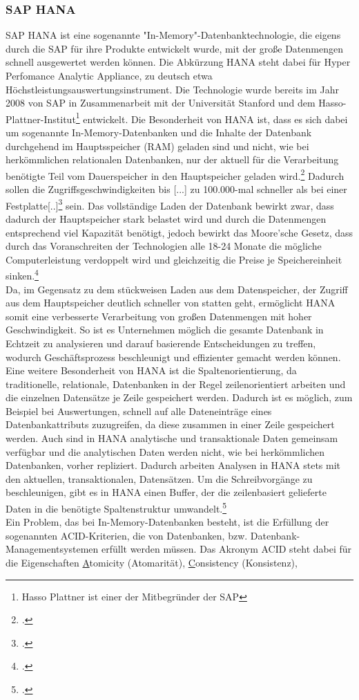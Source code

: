 \subsubsection{SAP HANA}
SAP HANA ist eine sogenannte "In-Memory"-Datenbanktechnologie, die eigens durch die SAP für ihre Produkte entwickelt wurde, mit der große Datenmengen schnell ausgewertet werden können. Die Abkürzung HANA steht dabei für \glqq{}Hyper Perfomance Analytic Appliance\grqq{}, zu deutsch etwa \glqq{}Höchstleistungsauswertungsinstrument\grqq{}. Die Technologie wurde bereits im Jahr 2008 von SAP in Zusammenarbeit mit der Universität Stanford und dem Hasso-Plattner-Institut\footnote{Hasso Plattner ist einer der Mitbegründer der SAP} entwickelt. Die Besonderheit von HANA ist, dass es sich dabei um sogenannte \glqq{}In-Memory-Datenbanken\grqq{} und die Inhalte der Datenbank durchgehend im Hauptsspeicher (RAM) geladen sind und nicht, wie bei herkömmlichen relationalen Datenbanken, nur der aktuell für die Verarbeitung benötigte Teil vom Dauerspeicher in den Hauptspeicher geladen wird.\footcite[Vgl.][]{was-hana} Dadurch sollen die Zugriffsgeschwindigkeiten bis \glqq{}[...] zu 100.000-mal schneller als bei einer Festplatte[..]\grqq{}\footcite[Vgl.][]{rz10-hana} sein. Das vollständige Laden der Datenbank bewirkt zwar, dass dadurch der Hauptspeicher stark belastet wird und durch die Datenmengen entsprechend viel Kapazität benötigt, jedoch bewirkt das Moore'sche Gesetz, dass durch das Voranschreiten der Technologien alle 18-24 Monate die mögliche Computerleistung verdoppelt wird und gleichzeitig die Preise je Speichereinheit sinken.\footcite[Vgl.][]{mooresches}\\ Da, im Gegensatz zu dem stückweisen Laden aus dem Datenspeicher, der Zugriff aus dem Hauptspeicher deutlich schneller von statten geht, ermöglicht HANA somit eine verbesserte Verarbeitung von großen Datenmengen mit hoher Geschwindigkeit. So ist es Unternehmen möglich die gesamte Datenbank in Echtzeit zu analysieren und darauf basierende Entscheidungen zu treffen, wodurch Geschäftsprozess beschleunigt und effizienter gemacht werden können. Eine weitere Besonderheit von HANA ist die Spaltenorientierung, da traditionelle, relationale, Datenbanken in der Regel zeilenorientiert arbeiten und die einzelnen Datensätze je Zeile gespeichert werden. Dadurch ist es möglich, zum Beispiel bei Auswertungen, schnell auf alle Dateneinträge eines Datenbankattributs zuzugreifen, da diese zusammen in einer Zeile gespeichert werden. Auch sind in HANA analytische und transaktionale Daten gemeinsam verfügbar und die analytischen Daten werden nicht, wie bei herkömmlichen Datenbanken, vorher repliziert. Dadurch arbeiten Analysen in HANA stets mit den aktuellen, transaktionalen, Datensätzen. Um die Schreibvorgänge zu beschleunigen, gibt es in HANA einen Buffer, der die zeilenbasiert gelieferte Daten in die benötigte Spaltenstruktur umwandelt.\footcite[Vgl.][]{was-hana}\\Ein Problem, das bei In-Memory-Datenbanken besteht, ist die Erfüllung der sogenannten ACID-Kriterien, die von Datenbanken, bzw. Datenbank-Managementsystemen erfüllt werden müssen. Das Akronym \glqq{}ACID\grqq{} steht dabei für die Eigenschaften \underline{A}tomicity (Atomarität), \underline{C}onsistency (Konsistenz), 